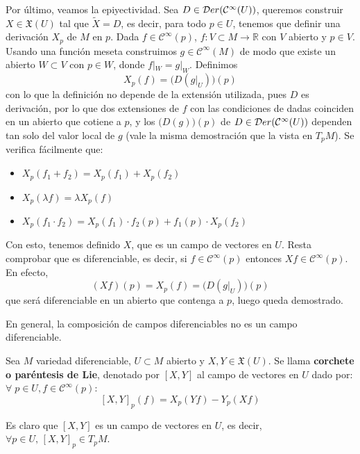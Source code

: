 \begin{dem}
Por último, veamos la epiyectividad. Sea $D\in \mathcal{D}er(\mathcal{C}^{\infty}(U))$, queremos construir $X \in \mathfrak{X}(U)$ tal que $\tilde{X} = D$, es decir, para todo $p \in U$, tenemos que definir una derivación $X_p$ de $M$ en $p$. Dada $f \in \mathcal{C}^{\infty}(p)$, $f: V \subset M \to \mathbb{R}$ con $V$ abierto y $p \in V$. Usando una función meseta construimos $g \in \mathcal{C}^{\infty}(M)$ de modo que existe un abierto $W \subset V$ con $p \in W$, donde $f|_W = g|_W$. Definimos $$X_p(f) = \Big(D(g|_U)\Big)(p)$$
con lo que la definición no depende de la extensión utilizada, pues $D$ es derivación, por lo que dos extensiones de $f$ con las condiciones de dadas coinciden en un abierto que cotiene a $p$, y los $\big( D(g) \big)(p)$ de $D \in \mathcal{D}er(\mathcal C^{\infty}(U))$ dependen tan solo del valor local de $g$ (vale la misma demostración que la vista en $T_pM$). Se verifica fácilmente que:
\begin{itemize}
    \item $X_p(f_1 + f_2) = X_p(f_1) + X_p(f_2)$
    \item $X_p(\lambda f) = \lambda X_p(f)$
    \item $X_p(f_1 \cdot f_2) = X_p(f_1) \cdot f_2(p) + f_1(p) \cdot X_p(f_2)$
\end{itemize}
Con esto, tenemos definido $X$, que es un campo de vectores en $U$. Resta comprobar que es diferenciable, es decir, si $f \in \mathcal{C}^{\infty}(p)$ entonces $Xf \in \mathcal{C}^{\infty}(p)$. En efecto,
$$(Xf)(p) = X_p(f) = \Big(D(g|_U)\Big)(p)$$
que será diferenciable en un abierto que contenga a $p$, luego queda demostrado.
\end{dem}

\begin{obs}
En general, la composición de campos diferenciables no es un campo diferenciable.
\end{obs}

\begin{defi}
Sea $M$ variedad diferenciable, $U \subset M$ abierto y $X,Y \in \mathfrak{X}(U)$. Se llama \textbf{corchete o paréntesis de Lie}, denotado por $[X,Y]$ al campo de vectores en $U$ dado por: $\forall\;p\in U, f\in \mathcal{C}^{\infty}(p)$:
$$[X,Y]_p (f) = X_p(Yf) - Y_p(Xf)$$
\end{defi}
\begin{obs}
    Es claro que $[X,Y]$ es un campo de vectores en $U$, es decir, $\forall p \in U, \, [X,Y]_p \in T_pM$. 
\end{obs}

